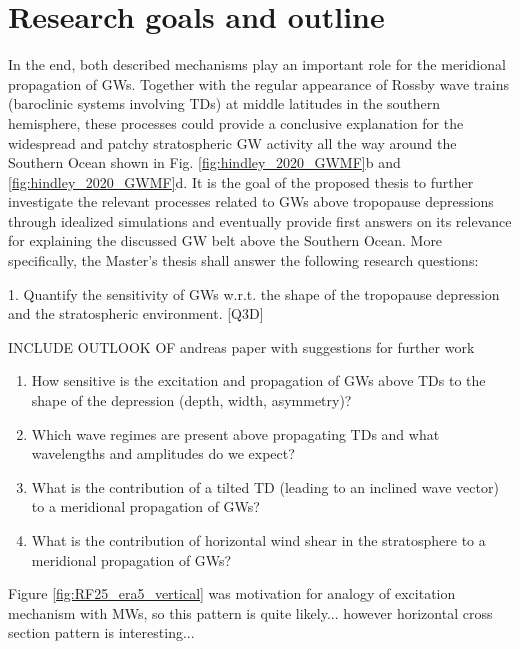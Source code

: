 \section{Research goals and outline}
\label{sec:goals}
%
In the end, both described mechanisms play an important role for the meridional propagation of GWs. Together with the regular appearance of Rossby wave trains (baroclinic systems involving TDs) at middle latitudes in the southern hemisphere, these processes could provide a conclusive explanation for the widespread and patchy stratospheric GW activity all the way around the Southern Ocean shown in Fig. \ref{fig:hindley_2020_GWMF}b and \ref{fig:hindley_2020_GWMF}d. It is the goal of the proposed thesis to further investigate the relevant processes related to GWs above tropopause depressions through idealized simulations and eventually provide first answers on its relevance for explaining the discussed GW belt above the Southern Ocean. More specifically, the Master's thesis shall answer the following research questions:
%

1. Quantify the sensitivity of GWs w.r.t. the shape of the tropopause depression and the stratospheric environment. [Q3D] 


INCLUDE OUTLOOK OF andreas paper with suggestions for further work

\begin{enumerate}
    \item How sensitive is the excitation and propagation of GWs above TDs to the shape of the depression (depth, width, asymmetry)?
    \item Which wave regimes are present above propagating TDs and what wavelengths and amplitudes do we expect?
    \item What is the contribution of a tilted TD (leading to an inclined wave vector) to a meridional propagation of GWs?
    \item What is the contribution of horizontal wind shear in the stratosphere to a meridional propagation of GWs?
\end{enumerate}


Figure \ref{fig:RF25_era5_vertical} was motivation for analogy of excitation mechanism with MWs, so this pattern is quite likely... however horizontal cross section pattern is interesting...

